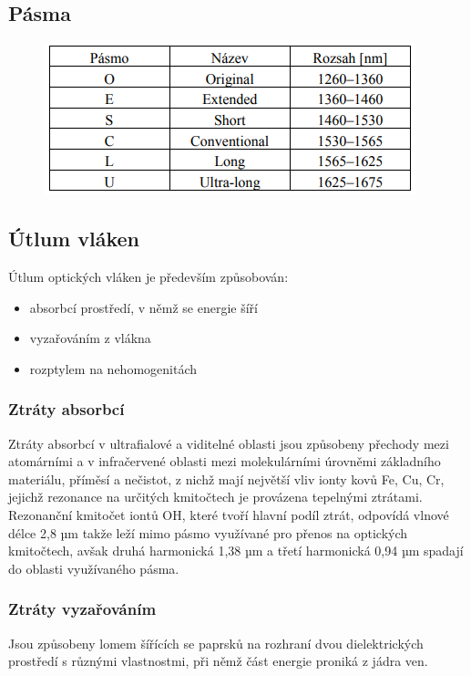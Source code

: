 \subsection{Pásma}
\begin{figure}[!ht]
\begin{center}
    \includegraphics[scale=1]{obrazky/pasma.png}
  \end{center}
\end{figure}

\subsection{Útlum vláken}
Útlum optických vláken je především způsobován:
\begin{itemize}
    \item absorbcí prostředí, v němž se energie šíří
    \item vyzařováním z vlákna
    \item rozptylem na nehomogenitách
\end{itemize}

\subsubsection{Ztráty absorbcí}
Ztráty absorbcí v ultrafialové a viditelné oblasti jsou způsobeny přechody mezi atomárními a v infračervené oblasti mezi molekulárními úrovněmi základního materiálu, příměsí a nečistot, z nichž mají největší vliv ionty kovů Fe, Cu, Cr, jejichž rezonance na určitých kmitočtech je provázena tepelnými ztrátami. Rezonanční kmitočet iontů OH, které tvoří hlavní podíl ztrát, odpovídá vlnové délce 2,8 µm takže leží mimo pásmo využívané pro přenos na optických kmitočtech, avšak druhá harmonická 1,38 µm a třetí harmonická 0,94 µm spadají do oblasti využívaného pásma.

\subsubsection{Ztráty vyzařováním}
Jsou způsobeny lomem šířících se paprsků na rozhraní dvou dielektrických prostředí s různými vlastnostmi, při němž část energie proniká z jádra ven. 

